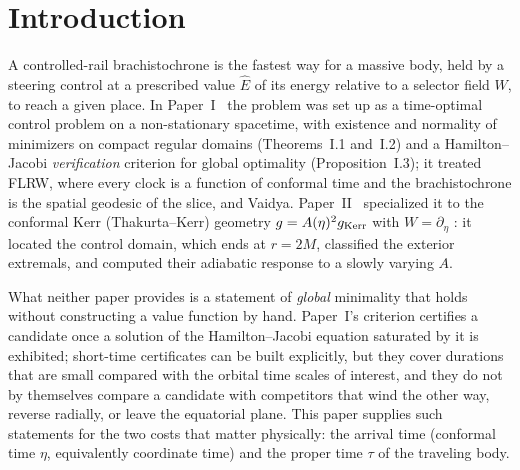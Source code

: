 \documentclass[aip,jmp,amsmath,amssymb,reprint]{revtex4-2}
\newcommand{\Ehat}{\hat E}
\theoremstyle{plain}
\theoremstyle{definition}
\begin{document}
\section{Introduction}
\label{sec:intro}
A controlled-rail brachistochrone is the fastest way for a massive body, held by a steering control
at a prescribed value $\Ehat$ of its energy relative to a selector field $W$, to reach a given place.
In Paper~I~\cite{PaperOne} the problem was set up as a time-optimal control problem on a
non-stationary spacetime, with existence and normality of minimizers on compact regular domains
(Theorems~I.1 and~I.2) and a Hamilton--Jacobi \emph{verification} criterion for global optimality
(Proposition~I.3); it treated FLRW, where every clock is a function of conformal time and the
brachistochrone is the spatial geodesic of the slice, and Vaidya. Paper~II~\cite{PaperTwo}
specialized it to the conformal Kerr (Thakurta--Kerr) geometry $g=A(\eta)^2g_{\rm Kerr}$ with
$W=\partial_\eta$ \cite{Thakurta1981,Kerr1963}: it located the control domain, which ends at $r=2M$,
classified the exterior extremals, and computed their adiabatic response to a slowly varying $A$.

What neither paper provides is a statement of \emph{global} minimality that holds without
constructing a value function by hand. Paper~I's criterion certifies a candidate once a solution of
the Hamilton--Jacobi equation saturated by it is exhibited; short-time certificates can be built
explicitly, but they cover durations that are small compared with the orbital time scales of
interest, and they do not by themselves compare a candidate with competitors that wind the other
way, reverse radially, or leave the equatorial plane. This paper supplies such statements for the
two costs that matter physically: the arrival time (conformal time $\eta$, equivalently coordinate
time) and the proper time $\tau$ of the traveling body.
\end{document}
